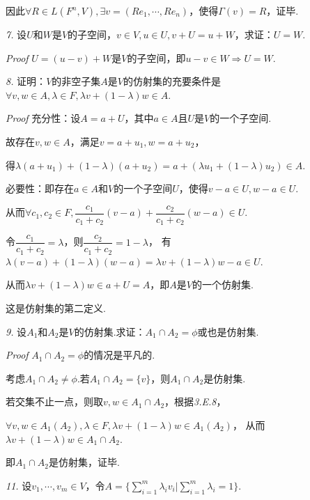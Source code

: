 因此\(\forall R \in L(F^n,V),\exists v=(Re_1,\cdots,Re_n)\)，使得\(\Gamma(v)=R\)，证毕.

\hspace*{\fill}

\textit{7.}
设\(U\)和\(W\)是\(V\)的子空间，\(v \in V,u \in U,v+U=u+W\)，求证：\(U=W\).

\textit{Proof}
\(U=(u-v)+W\)是\(V\)的子空间，即\(u-v \in W \Rightarrow U=W\).

\hspace*{\fill}

\textit{8.}
证明：\(V\)的非空子集\(A\)是\(V\)的仿射集的充要条件是\(\forall v,w \in A,\lambda \in F,\lambda v+(1- \lambda)w \in A\).

\textit{Proof}
充分性：设\(A=a+U\)，其中\(a\in A\)且\(U\)是\(V\)的一个子空间.

故存在\(v,w \in A\)，满足\(v=a+u_1,w=a+u_2\)，

得\(\lambda(a+u_1)+(1-\lambda)(a+u_2)=a+(\lambda u_1+(1-\lambda)u_2) \in A\).

必要性：即存在\(a \in A\)和\(V\)的一个子空间\(U\)，使得\(v-a \in U,w-a \in U\).

从而\(\forall c_1,c_2 \in F,\dfrac{c_1}{c_1+c_2}(v-a)+\dfrac{c_2}{c_1+c_2}(w-a) \in U\).

令\(\dfrac{c_1}{c_1+c_2}=\lambda\)，则\(\dfrac{c_2}{c_1+c_2}=1-\lambda\)，
有\(\lambda (v-a)+(1- \lambda)(w-a)=\lambda v+(1- \lambda)w-a \in U\).

从而\(\lambda v+(1- \lambda)w \in a+U=A\)，即\(A\)是\(V\)的一个仿射集.

这是仿射集的第二定义.

\newpage

\textit{9.}
设\(A_1\)和\(A_2\)是\(V\)的仿射集.求证：\(A_1 \cap A_2=\phi\)或也是仿射集.

\textit{Proof}
\(A_1 \cap A_2=\phi\)的情况是平凡的.

考虑\(A_1 \cap A_2 \ne \phi\).若\(A_1 \cap A_2=\{v\}\)，则\(A_1 \cap A_2\)是仿射集.

若交集不止一点，则取\(v,w \in A_1 \cap A_2\)，根据\textit{3.E.8}，

\(\forall v,w \in A_1(A_2),\lambda \in F,\lambda v+(1- \lambda)w \in A_1(A_2)\)，
从而\(\lambda v+(1- \lambda)w \in A_1 \cap A_2\).

即\(A_1 \cap A_2\)是仿射集，证毕.

\hspace*{\fill}

\textit{11.}
设\(v_1,\cdots,v_m \in V\)，令\(A=\{\sum_{i=1}^m \lambda_i v_i|\sum_{i=1}^m \lambda_i=1\}\).

